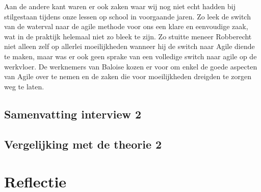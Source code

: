 \documentclass{hogent-article}
\begin{document}
Aan de andere kant waren er ook zaken waar wij nog niet echt hadden bij stilgestaan tijdens onze lessen op school in voorgaande jaren. Zo leek de switch van de waterval naar de agile methode voor ons een klare en eenvoudige zaak, wat in de praktijk helemaal niet zo bleek te zijn. Zo stuitte meneer Robberecht niet alleen zelf op allerlei moeilijkheden wanneer hij de switch naar Agile diende te maken, maar was er ook geen sprake van een volledige switch naar agile op de werkvloer. De werknemers van Baloise kozen er voor om enkel de goede aspecten van Agile over te nemen en de zaken die voor moeilijkheden dreigden te zorgen weg te laten.



\subsection{ Samenvatting interview 2}

\subsection{Vergelijking met de theorie 2}

\section{Reflectie}


\printbibliography[heading=bibintoc]
\end{document}
